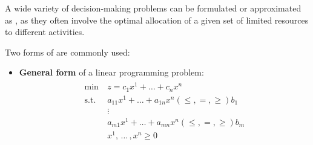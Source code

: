 \documentclass[english]{article}
\begin{document}
\bigskip
A wide variety of decision-making problems can be formulated or approximated as \LP, as they often involve the optimal allocation of a given set of limited resources to different activities.

\bigskip
Two forms of \LP are commonly used:

\begin{itemize}
  \item \textbf{General form} of a linear programming problem:
        \begin{gather*}
          \begin{aligned}
            \min \         & z = c_1 x^1 + \ldots + c_n x^n                                    \\
            \text{s.t.} \  & a_{11} x^1 + \ldots + a_{1n} x^n \left( \leq, =, \geq \right) b_1 \\
                           & \vdots                                                            \\
                           & a_{m1} x^1 + \ldots + a_{mn} x^n \left( \leq, =, \geq \right) b_m \\
                           & x^1, \, \ldots \,, x^n \geq 0
          \end{aligned}
        \end{gather*}


\end{itemize}
\end{document}
